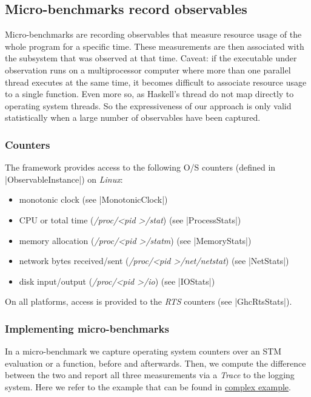 

\subsection{Micro-benchmarks record observables}\label{sec:mubenchmarks}

Micro-benchmarks are recording observables that measure resource usage of the
whole program for a specific time. These measurements are then associated with
the subsystem that was observed at that time.
Caveat: if the executable under observation runs on a multiprocessor computer
where more than one parallel thread executes at the same time, it becomes
difficult to associate resource usage to a single function. Even more so, as
Haskell's thread do not map directly to operating system threads. So the
expressiveness of our approach is only valid statistically when a large number
of observables have been captured.

\subsubsection{Counters}

The framework provides access to the following O/S counters (defined in |ObservableInstance|) on \emph{Linux}:
\\
\begin{itemize}
\item monotonic clock (see |MonotonicClock|)
\item CPU or total time (\emph{/proc/\textless pid \textgreater/stat}) (see |ProcessStats|)
\item memory allocation (\emph{/proc/\textless pid \textgreater/statm}) (see |MemoryStats|)
\item network bytes received/sent (\emph{/proc/\textless pid \textgreater/net/netstat}) (see |NetStats|)
\item disk input/output (\emph{/proc/\textless pid \textgreater/io}) (see |IOStats|)
\end{itemize}

On all platforms, access is provided to the \emph{RTS} counters (see |GhcRtsStats|).

\subsubsection{Implementing micro-benchmarks}

In a micro-benchmark we capture operating system counters over an STM evaluation
or a function, before and afterwards. Then, we compute the difference between the
two and report all three measurements via a \emph{Trace} to the logging system.
Here we refer to the example that can be found in \hyperref[sec:examplecomplex]{complex example}.

